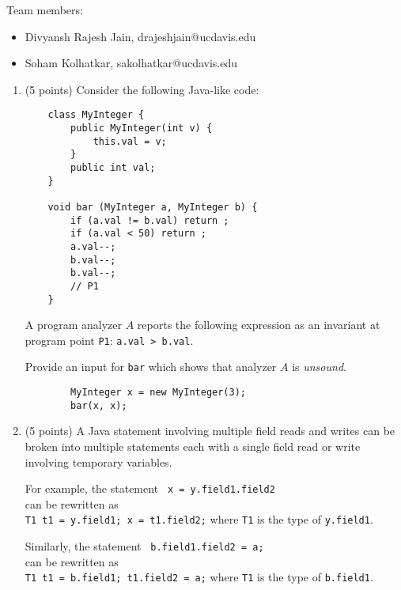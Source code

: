 \documentclass[12pt]{article}
\begin{document}
    \begin{mdframed}
      Team members:
      \begin{itemize}
        \item Divyansh Rajesh Jain, drajeshjain@ucdavis.edu %
        \item Soham Kolhatkar, sakolhatkar@ucdavis.edu %
      \end{itemize}
    \end{mdframed}

    
    \newpage
    \begin{enumerate}

    

\item (5 points) Consider the following Java-like code:
  \begin{lstlisting}
    class MyInteger {
        public MyInteger(int v) {
            this.val = v;
        }
        public int val;
    }

    void bar (MyInteger a, MyInteger b) {
        if (a.val != b.val) return ;
        if (a.val < 50) return ;
        a.val--;
        b.val--;
        b.val--;
        // P1
    }
  \end{lstlisting}
  A program analyzer $A$
  reports the following expression as an invariant 
  at program point \lstinline$P1$: \lstinline$a.val > b.val$.

  Provide an input for \lstinline$bar$ which shows that analyzer $A$ is \emph{unsound}.
    \begin{mdframed}
      \begin{lstlisting}
        MyInteger x = new MyInteger(3);
        bar(x, x);
      \end{lstlisting}
    \end{mdframed}

  \newpage
  \item (5 points) A Java statement involving multiple field reads and writes can be broken into
  multiple statements each with a single field read or write involving temporary variables.

  For example, the statement \lstinline$ x = y.field1.field2$ \\
  can be rewritten as \\ 
  \lstinline$T1 t1 = y.field1; x = t1.field2;$ where
  \lstinline$T1$ is the type of \lstinline$y.field1$.

  Similarly, the statement \lstinline$ b.field1.field2 = a;$ \\
  can  be rewritten as \\ 
  \lstinline$T1 t1 = b.field1; t1.field2 = a;$ where
  \lstinline$T1$ is the type of \lstinline$b.field1$.


\end{enumerate}
\end{document}
